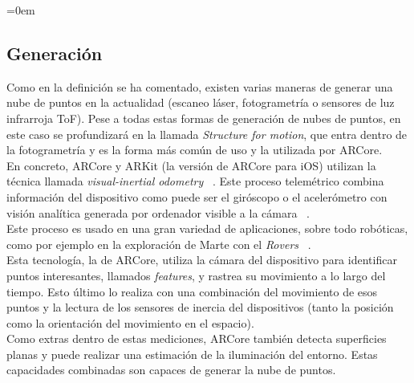 \parindent=0em
\subsection{Generación}
\noindent

Como en la definición se ha comentado, existen varias maneras de generar una nube de puntos en la actualidad (escaneo láser, fotogrametría o sensores de luz infrarroja ToF). Pese a todas estas formas de generación de nubes de puntos, en este caso se profundizará en la llamada \textit{Structure for motion}, que entra dentro de la fotogrametría y es la forma más común de uso y la utilizada por ARCore. \\

En concreto, ARCore y ARKit (la versión de ARCore para iOS) utilizan la técnica llamada \textit{visual-inertial odometry} ~\cite{ VisualOdometry}. Este proceso telemétrico combina información del dispositivo como puede ser el giróscopo o el acelerómetro con visión analítica generada por ordenador visible a la cámara ~\cite{ WorldTracking}. \\

Este proceso es usado en una gran variedad de aplicaciones, sobre todo robóticas, como por ejemplo en la exploración de Marte con el \textit{Rovers} ~\cite{ MarsExploration}. \\

Esta tecnología, la de ARCore, utiliza la cámara del dispositivo para identificar puntos interesantes, llamados \textit{features}, y rastrea su movimiento a lo largo del tiempo. Esto último lo realiza con una combinación del movimiento de esos puntos y la lectura de los sensores de inercia del dispositivos (tanto la posición como la orientación del movimiento en el espacio).\\

Como extras dentro de estas mediciones, ARCore también detecta superficies planas y puede realizar una estimación de la iluminación del entorno. Estas capacidades combinadas son capaces de generar la nube de puntos.
~\cite{HowARCoreWorks} \\

